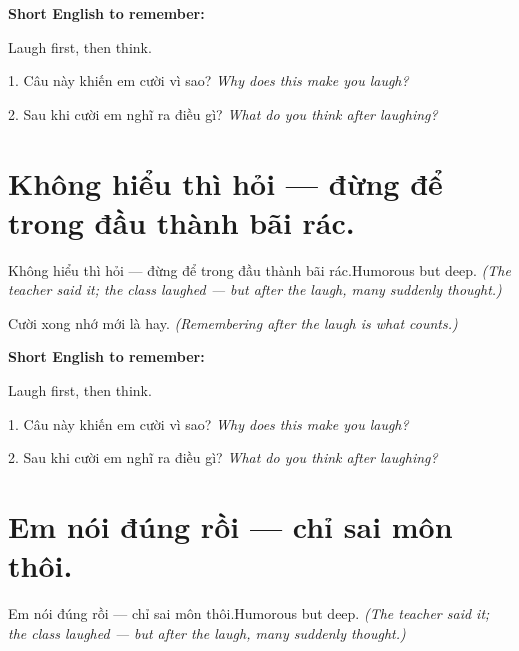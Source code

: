 \begin{ghinhoanh}
\textbf{Short English to remember:}

Laugh first, then think.

\end{ghinhoanh}

\begin{tuhocnhanh}
1. Câu này khiến em cười vì sao? \textit{Why does this make you laugh?}

2. Sau khi cười em nghĩ ra điều gì? \textit{What do you think after laughing?}
\end{tuhocnhanh}
\ngancach


\section{Không hiểu thì hỏi — đừng để trong đầu thành bãi rác.}
\begin{truyen}{Không hiểu thì hỏi — đừng để trong đầu thành bãi rác.}{Humorous but deep.}
\textit{(The teacher said it; the class laughed — but after the laugh, many suddenly thought.)}
\end{truyen}

\begin{baihoc}
Cười xong nhớ mới là hay.
\textit{(Remembering after the laugh is what counts.)}
\end{baihoc}

\begin{ghinhoanh}
\textbf{Short English to remember:}

Laugh first, then think.

\end{ghinhoanh}

\begin{tuhocnhanh}
1. Câu này khiến em cười vì sao? \textit{Why does this make you laugh?}

2. Sau khi cười em nghĩ ra điều gì? \textit{What do you think after laughing?}
\end{tuhocnhanh}
\ngancach


\section{Em nói đúng rồi — chỉ sai môn thôi.}
\begin{truyen}{Em nói đúng rồi — chỉ sai môn thôi.}{Humorous but deep.}
\textit{(The teacher said it; the class laughed — but after the laugh, many suddenly thought.)}
\end{truyen}

